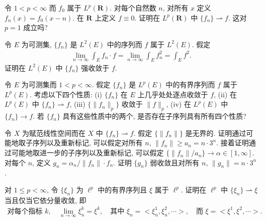\documentclass[../../main.tex]{subfiles}
\begin{document}
\begin{exercise}\label{exercise:ch08-15}
令 $1<p<\infty$ 而 $f_{0}$ 属于 $L^{p}(\mathbf{R})$. 对每个自然数 $n$, 对所有 $x$ 定义 $f_{n}(x)=f_{0}(x-n)$. 在 $\mathbf{R}$ 上定义 $f\equiv 0$. 证明在 $L^{p}(\mathbf{R})$ 中 $\{f_{n}\}\rightharpoonup f$. 这对 $p=1$ 成立吗?
\end{exercise}

\begin{exercise}\label{exercise:ch08-16}
令 $E$ 为可测集, $\{f_{n}\}$ 是 $L^{2}(E)$ 中的序列而 $f$ 属于 $L^{2}(E)$. 假定
\begin{align*}
\lim_{n\to\infty}\int_{E}f_{n}\cdot f=\lim_{n\to\infty}\int_{E}f_{n}^{2}=\int_{E}f^{2}.
\end{align*}
证明在 $L^{2}(E)$ 中 $\{f_{n}\}$ 强收敛于 $f$.
\end{exercise}

\begin{exercise}\label{exercise:ch08-17}
令 $E$ 为可测集而 $1<p<\infty$. 假定 $\{f_{n}\}$ 是 $L^{p}(E)$ 中的有界序列而 $f$ 属于 $L^{p}(E)$. 考虑以下四个性质: (i) $\{f_{n}\}$ 在 $E$ 上几乎处处逐点收敛于 $f$, (ii) 在 $L^{p}(E)$ 中 $\{f_{n}\}\rightharpoonup f$, (iii) $\{\|f_{n}\|_{p}\}$ 收敛于 $\|f\|_{p}$, (iv) 在 $L^{p}(E)$ 中 $\{f_{n}\}\to f$. 若 $\{f_{n}\}$ 具有这些性质中的两个, 是否存在子序列具有所有四个性质?
\end{exercise}

\begin{exercise}\label{exercise:ch08-18}
令 $X$ 为赋范线性空间而在 $X$ 中 $\{f_{n}\}\rightharpoonup f$. 假定 $\{\|f_{n}\|\}$ 是无界的. 证明通过可能地取子序列以及重新标记, 可以假定对所有 $n$, $\|f_{n}\|\geqslant a_{n}=n\cdot 3^{n}$. 接着证明通过可能地取进一步的子序列以及重新标记, 可以假定 $\{\|f_{n}\|/a_{n}\}\to\alpha\in[1,\infty]$. 对每个 $n$, 定义 $g_{n}=\alpha_{n}/\|f_{n}\|\cdot f_{n}$. 证明 $\{g_{n}\}$ 弱收敛且对所有 $n$, $\|g_{n}\|=n\cdot 3^{n}$.
\end{exercise}

\begin{exercise}\label{exercise:ch08-19}
对 $1\leqslant p<\infty$, 令 $\{\xi_{n}\}$ 为 $\ell^{p}$ 中的有界序列且 $\xi$ 属于 $\ell^{p}$. 证明在 $\ell^{p}$ 中 $\{\xi_{n}\}\rightharpoonup\xi$ 当且仅当它依分量收敛, 即
\begin{align*}
\text{对每个指标 }k,\quad\lim_{n\to\infty}\xi_{n}^{k}=\xi^{k},\quad\text{其中 }\xi_{n}=<\xi_{n}^{1},\xi_{n}^{2},\cdots>,\quad\text{而 }\xi=<\xi^{1},\xi^{2},\cdots>.
\end{align*}
\end{exercise}
\end{document}
